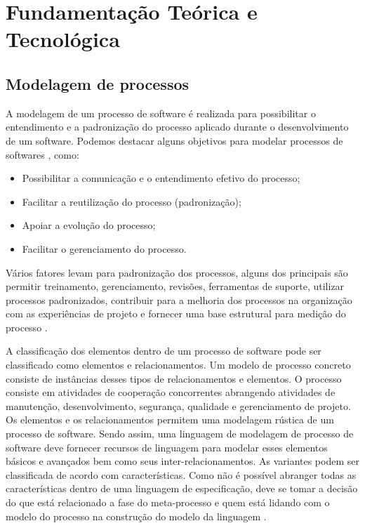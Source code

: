 \section{Fundamentação Teórica e Tecnológica}\label{fundamentacaoTeorica}

\subsection{Modelagem de processos}
A modelagem de um processo de software é realizada para possibilitar o entendimento e a padronização do processo aplicado durante o desenvolvimento de um software. Podemos destacar alguns objetivos para modelar processos de softwares \cite{genvigir2003modelagem}, como:

\begin{itemize}
	\item Possibilitar a comunicação e o entendimento efetivo do processo;
	\item Facilitar a reutilização do processo (padronização);
	\item Apoiar a evolução do processo;
	\item Facilitar o gerenciamento do processo.
\end{itemize}

Vários fatores levam para padronização dos processos, alguns dos principais são permitir treinamento, gerenciamento, revisões,
ferramentas de suporte, utilizar processos padronizados, contribuir para a melhoria dos processos na organização com as experiências de projeto e fornecer uma base estrutural para medição do processo \cite{genvigir2003modelagem}.


A classificação dos elementos dentro de um processo de software pode ser classificado como elementos e relacionamentos. Um modelo de processo concreto consiste de instâncias desses tipos de relacionamentos e elementos. O processo consiste em atividades de cooperação concorrentes abrangendo atividades de manutenção, desenvolvimento, segurança, qualidade e gerenciamento de projeto. Os elementos e os relacionamentos permitem uma modelagem rústica de um processo de software. Sendo assim, uma linguagem de modelagem de processo de software deve fornecer recursos de linguagem para modelar esses elementos básicos e avançados bem como seus inter-relacionamentos. As variantes podem ser classificada de acordo com características. Como não é possível abranger todas as características dentro de uma linguagem de especificação, deve se tomar a decisão do que está relacionado a fase do meta-processo e quem está lidando com o modelo do processo na construção do modelo da linguagem \cite{genvigir2003modelagem}.


